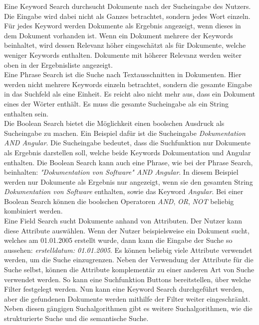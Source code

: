 Eine Keyword Search durchsucht Dokumente nach der Sucheingabe des Nutzers.
Die Eingabe wird dabei nicht als Ganzes betrachtet, sondern jedes Wort einzeln.
Für jedes Keyword werden Dokumente als Ergebnis angezeigt, wenn dieses in dem Dokument vorhanden ist.
Wenn ein Dokument mehrere der Keywords beinhaltet, wird dessen Relevanz höher eingeschätzt als für Dokumente, welche weniger Keywords enthalten.
Dokumente mit höherer Relevanz werden weiter oben in der Ergebnisliste angezeigt.\\

Eine Phrase Search ist die Suche nach Textausschnitten in Dokumenten.
Hier werden nicht mehrere Keywords einzeln betrachtet, sondern die gesamte Eingabe in das Suchfeld als eine Einheit.
Es reicht also nicht mehr aus, dass ein Dokument eines der Wörter enthält.
Es muss die gesamte Sucheingabe als ein String enthalten sein.\\

Die Boolean Search bietet die Möglichkeit einen boolschen Ausdruck als Sucheingabe zu machen.
Ein Beispiel dafür ist die Sucheingabe \textit{Dokumentation AND Angular}.
Die Sucheingabe bedeutet, dass die Suchfunktion nur Dokumente als Ergebnis darstellen soll, welche beide Keywords Dokumentation und Angular enthalten.
Die Boolean Search kann auch eine Phrase, wie bei der Phrase Search, beinhalten: \textit{"Dokumentation von Software" AND Angular}.
In diesem Beispiel werden nur Dokumente als Ergebnis nur angezeigt, wenn sie den gesamten String \textit{Dokumentation von Software} enthalten, sowie das Keyword \textit{Angular}.
Bei einer Boolean Search können die boolschen Operatoren \textit{AND}, \textit{OR}, \textit{NOT} beliebig kombiniert werden.\\

Eine Field Search sucht Dokumente anhand von Attributen.
Der Nutzer kann diese Attribute auswählen.
Wenn der Nutzer beispielsweise ein Dokument sucht, welches am 01.01.2005 erstellt wurde, dann kann die Eingabe der Suche so aussehen: \textit{erstelldatum: 01.01.2005}.
Es können beliebig viele Attribute verwendet werden, um die Suche einzugrenzen.
Neben der Verwendung der Attribute für die Suche selbst, können die Attribute komplementär zu einer anderen Art von Suche verwendet werden.
So kann eine Suchfunktion Buttons bereitstellen, über welche Filter festgelegt werden.
Nun kann eine Keyword Search durchgeführt werden, aber die gefundenen Dokumente werden mithilfe der Filter weiter eingeschränkt.
Neben diesen gängigen Suchalgorithmen gibt es weitere Suchalgorithmen, wie die strukturierte Suche und die semantische Suche.

